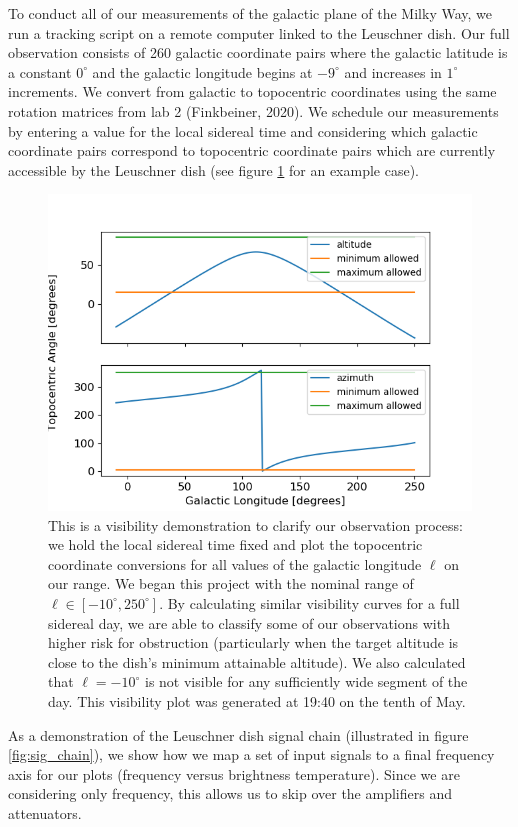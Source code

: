 \documentclass[12pt]{article}
\begin{document}
\quad \quad To conduct all of our measurements of the galactic plane of the Milky Way, we run a tracking script on a remote computer linked to the Leuschner dish. Our full observation consists of 260 galactic coordinate pairs where the galactic latitude is a constant $0^\circ$ and the galactic longitude begins at $-9^\circ$ and increases in $1^\circ$ increments. We convert from galactic to topocentric coordinates using the same rotation matrices from lab 2 (Finkbeiner, 2020). We schedule our measurements by entering a value for the local sidereal time and considering which galactic coordinate pairs correspond to topocentric coordinate pairs which are currently accessible by the Leuschner dish (see figure \ref{fig:vis_demo} for an example case).

\begin{figure}
	\centering
	\includegraphics[width=.75\linewidth]{1940_10_05_2020}
	\caption{This is a visibility demonstration to clarify our observation process: we hold the local sidereal time fixed and plot the topocentric coordinate conversions for all values of the galactic longitude $\ell$ on our range. We began this project with the nominal range of $\ell \in [-10^\circ, 250^\circ]$. By calculating similar visibility curves for a full sidereal day, we are able to classify some of our observations with higher risk for obstruction (particularly when the target altitude is close to the dish's minimum attainable altitude). We also calculated that $\ell=-10^\circ$ is not visible for any sufficiently wide segment of the day. This visibility plot was generated at 19:40 on the tenth of May.}
	\label{fig:vis_demo}
\end{figure}

As a demonstration of the Leuschner dish signal chain (illustrated in figure \ref{fig:sig_chain}), we show how we map a set of input signals to a final frequency axis for our plots (frequency versus brightness temperature). Since we are considering only frequency, this allows us to skip over the amplifiers and attenuators.
\end{document}
